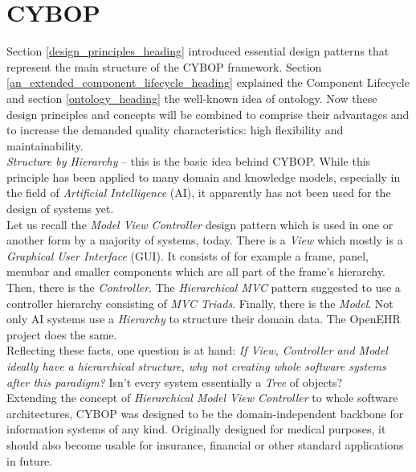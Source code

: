 %
%
%
%
%
%
%

\section{CYBOP}
\label{cybop_heading}

Section \ref{design_principles_heading} introduced essential design patterns
that represent the main structure of the CYBOP framework. Section
\ref{an_extended_component_lifecycle_heading} explained the Component Lifecycle
and section \ref{ontology_heading} the well-known idea of ontology. Now these
design principles and concepts will be combined to comprise their advantages and
to increase the demanded quality characteristics: high flexibility and
maintainability.\\
\emph{Structure by Hierarchy} -- this is the basic idea behind CYBOP. While this
principle has been applied to many domain and knowledge models, especially in the
field of \emph{Artificial Intelligence} (AI), it apparently has not been used
for the design of systems yet.\\
Let us recall the \emph{Model View Controller} design pattern which is used in
one or another form by a majority of systems, today. There is a \emph{View} which
mostly is a \emph{Graphical User Interface} (GUI). It consists of for example a
frame, panel, menubar and smaller components which are all part of the frame's
hierarchy. Then, there is the \emph{Controller}. The \emph{Hierarchical MVC}
pattern suggested to use a controller hierarchy consisting of \emph{MVC Triads}.
Finally, there is the \emph{Model}. Not only AI systems use a \emph{Hierarchy}
to structure their domain data. The OpenEHR project \cite{openehr} does the same.\\
Reflecting these facts, one question is at hand: \emph{If View, Controller and
Model ideally have a hierarchical structure, why not creating whole software
systems after this paradigm?} Isn't every system essentially a \emph{Tree} of
objects?\\
Extending the concept of \emph{Hierarchical Model View Controller} to whole
software architectures, CYBOP was designed to be the domain-independent backbone
for information systems of any kind. Originally designed for medical purposes,
it should also become usable for insurance, financial or other standard
applications in future.

